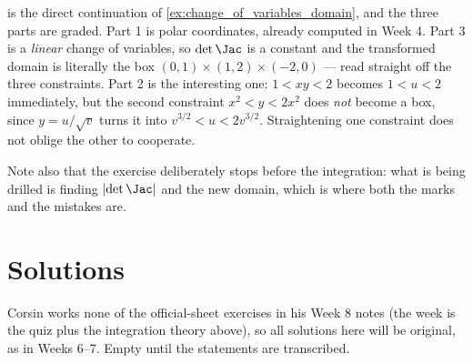 \begin{ainote}
 is the direct continuation of \cref{ex:change_of_variables_domain}, and the three
parts are graded. Part 1 is polar coordinates, already computed in Week 4. Part 3 is a
\emph{linear} change of variables, so $\det\Jac$ is a constant and the transformed domain is
literally the box $(0,1)\times(1,2)\times(-2,0)$ --- read straight off the three constraints.
Part 2 is the interesting one: $1 < xy < 2$ becomes $1 < u < 2$ immediately, but the second
constraint $x^2 < y < 2x^2$ does \emph{not} become a box, since $y = u/\sqrt v$ turns it into
$v^{3/2} < u < 2v^{3/2}$. Straightening one constraint does not oblige the other to cooperate.

Note also that the exercise deliberately stops before the integration: what is being drilled is
finding $\lvert\det\Jac\rvert$ and the new domain, which is where both the marks and the
mistakes are.
\end{ainote}

\section{Solutions}
\label{sec:week08_solutions}

\begin{ainote}
Corsin works none of the official-sheet exercises in his Week 8 notes (the week is the quiz plus
the integration theory above), so all solutions here will be original, as in Weeks 6--7. Empty
until the statements are transcribed.
\end{ainote}

